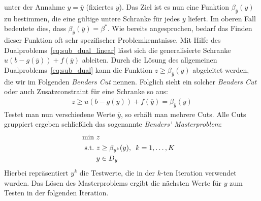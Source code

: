 \documentclass[a4paper, 11pt]{scrreprt}
\begin{document}
unter der Annahme $y = \overline{y}$ (fixiertes $y$).
Das Ziel ist es nun eine Funktion $\beta_{\overline{y}}(y)$ zu bestimmen, die eine gültige untere Schranke
für jedes $y$ liefert. Im oberen Fall bedeutete dies, dass $\beta_{\overline{y}}(\overline{y}) = \beta^*$.
Wie bereits angesprochen, bedarf das Finden dieser Funktion oft sehr spezifischer Problemkenntnisse.
Mit Hilfe des Dualproblems~\ref{eq:sub_dual_linear} lässt sich die generalisierte Schranke
$u(b - g(\overline{y})) + f(\overline{y})$ ableiten. Durch die Lösung des allgemeinen Dualproblems~\ref{eq:sub_dual}
kann die Funktion $z\geq \beta_{\overline{y}}(y)$ abgeleitet werden, die wir im Folgenden \textit{Benders Cut} nennen.
Folglich sieht ein solcher \textit{Benders Cut} oder auch Zusatzconstraint für eine Schranke so aus:
\begin{align}
  \label{eq:benders_cut}
  z \geq u(b - g(y)) + f(\overline{y}) = \beta_{\overline{y}}(y)
\end{align}
Testet man nun verschiedene Werte $\overline{y}$, so erhält man mehrere Cuts. Alle Cuts gruppiert
ergeben schließlich das sogenannte \textit{Benders' Masterproblem}:
\begin{align}
  \label{eq:benders_master}
  \text{min}\,\, z \notag\\
  \text{s.t.}\,\, z &\geq \beta_{y^k}(y), \,\,\, k = 1, \dots, K\\
  y &\in D_y\notag
\end{align}
Hierbei repräsentiert $y^k$ die Testwerte, die in der $k$-ten Iteration verwendet wurden. Das Lösen des
Masterproblems ergibt die nächsten Werte für $y$ zum Testen in der folgenden Iteration.
\end{document}
